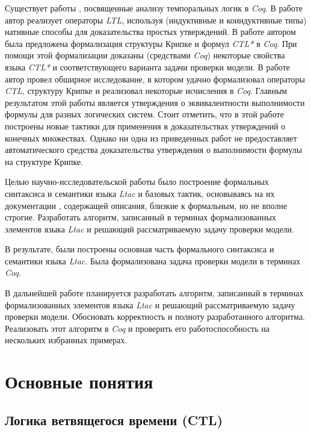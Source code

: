 \documentclass[12pt]{article}
\begin{document}
Существует работы \cite{2007}\cite{thesis}\cite{2003}, посвященные анализу темпоральных логик в \textit{Coq}.
В работе \cite{2003} автор реализует операторы \textit{LTL}, используя (индуктивные и коиндуктивные типы) нативные способы для доказательства простых утверждений. 
В работе \cite{2007} автором была предложена формализация структуры Крипке и формул \textit{CTL*} в \textit{Coq}. При помощи этой формализации доказаны (средствами \textit{Coq}) некоторые свойства языка \textit{CTL*} и соответствующего варианта задачи проверки модели. 
В работе \cite{thesis} автор провел обширное исследование, в котором удачно формализовал операторы \textit{CTL}, структуру Крипке и реализовал некоторые исчисления в \textit{Coq}. Главным результатом этой работы является утверждения о эквивалентности выполнимости формулы для разных логических систем. 
Стоит отметить, что в этой работе построены новые тактики для применения в доказательствах утверждений о конечных множествах. Однако ни одна из приведенных работ не предоставляет автоматического средства доказательства утверждения о выполнимости формулы на структуре Крипке.

Целью научно-исследовательской работы было построение формальных синтаксиса и семантики языка \textit{Ltac} и базовых тактик, основываясь на их документации \cite{Ltac}, содержащей описания, близкие к формальным, но не вполне строгие. Разработать алгоритм, записанный в терминах формализованных элементов языка \textit{Ltac} и решающий рассматриваемую задачу проверки модели.

В результате, были построены основная часть формального синтаксиса и семантики языка \textit{Ltac}. Была формализована задача проверки модели в терминах \textit{Coq}.

В дальнейшей работе планируется разработать алгоритм, записанный в терминах формализованных элементов языка \textit{Ltac} и решающий рассматриваемую задачу проверки модели. Обосновать корректность и полноту разработанного алгоритма. Реализовать этот алгоритм в \textit{Coq} и проверить его работоспособность на нескольких избранных примерах.

\section{Основные понятия}

\subsection{Логика ветвящегося времени (CTL)}
\end{document}
